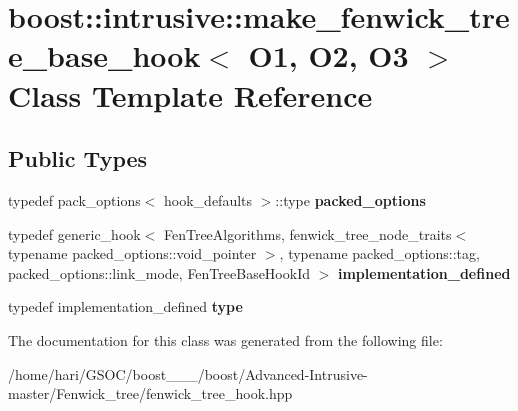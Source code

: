 \hypertarget{classboost_1_1intrusive_1_1make__fenwick__tree__base__hook}{}\section{boost\+:\+:intrusive\+:\+:make\+\_\+fenwick\+\_\+tree\+\_\+base\+\_\+hook$<$ O1, O2, O3 $>$ Class Template Reference}
\label{classboost_1_1intrusive_1_1make__fenwick__tree__base__hook}
\subsection*{Public Types}
\begin{DoxyCompactItemize}
\item 
\mbox{\label{classboost_1_1intrusive_1_1make__fenwick__tree__base__hook_af7deddd956f4b6beda854f8c98dcf637}} 
typedef pack\+\_\+options$<$ hook\+\_\+defaults $>$\+::type {\bfseries packed\+\_\+options}
\item 
\mbox{\label{classboost_1_1intrusive_1_1make__fenwick__tree__base__hook_af661b0546c575716fb1fc71c0446929c}} 
typedef generic\+\_\+hook$<$ Fen\+Tree\+Algorithms, fenwick\+\_\+tree\+\_\+node\+\_\+traits$<$ typename packed\+\_\+options\+::void\+\_\+pointer $>$, typename packed\+\_\+options\+::tag, packed\+\_\+options\+::link\+\_\+mode, Fen\+Tree\+Base\+Hook\+Id $>$ {\bfseries implementation\+\_\+defined}
\item 
\mbox{\label{classboost_1_1intrusive_1_1make__fenwick__tree__base__hook_ac194b5544afb5fb14dca7765784c8eb7}} 
typedef implementation\+\_\+defined {\bfseries type}
\end{DoxyCompactItemize}


The documentation for this class was generated from the following file\+:\begin{DoxyCompactItemize}
\item 
/home/hari/\+G\+S\+O\+C/boost\+\_\+\_\+\_/boost/\+Advanced-\/\+Intrusive-\/master/\+Fenwick\+\_\+tree/fenwick\+\_\+tree\+\_\+hook.\+hpp\end{DoxyCompactItemize}
